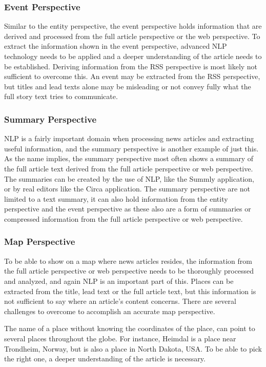 \subsubsection{Event Perspective}
Similar to the entity perspective, the event perspective holds information that are derived and processed from the full article perspective or the web perspective. To extract the information shown in the event perspective, advanced NLP technology needs to be applied and a deeper understanding of the article needs to be established. Deriving information from the RSS perspective is most likely not sufficient to overcome this. An event may be extracted from the RSS perspective, but titles and lead texts alone may be misleading or not convey fully what the full story text tries to communicate.

\subsubsection{Summary Perspective}
NLP is a fairly important domain when processing news articles and extracting useful information, and the summary perspective is another example of just this. As the name implies, the summary perspective most often shows a summary of the full article text derived from the full article perspective or web perspective. The summaries can be created by the use of NLP, like the Summly application, or by real editors like the Circa application. The summary perspective are not limited to a text summary, it can also hold information from the entity perspective and the event perspective as these also are a form of summaries or compressed information from the full article perspective or web perspective.

\subsubsection{Map Perspective}
To be able to show on a map where news articles resides, the information from the full article perspective or web perspective needs to be thoroughly processed and analyzed, and again NLP is an important part of this. Places can be extracted from the title, lead text or the full article text, but this information is not sufficient to say where an article's content concerns. There are several challenges to overcome to accomplish an accurate map perspective. 

The name of a place without knowing the coordinates of the place, can point to several places throughout the globe. For instance, Heimdal is a place near Trondheim, Norway, but is also a place in North Dakota, USA. To be able to pick the right one, a deeper understanding of the article is necessary. 

